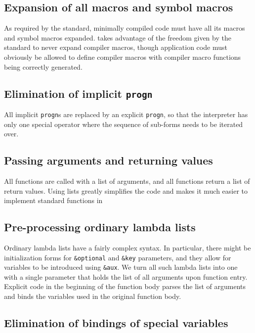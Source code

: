 \subsection{Expansion of all macros and symbol macros}

As required by the \commonlisp{} standard, minimally compiled code
must have all its macros and symbol macros expanded.  \sysname{} takes
advantage of the freedom given by the \commonlisp{} standard to never
expand compiler macros, though application code must obviously be
allowed to define compiler macros with compiler macro functions being
correctly generated.

\subsection{Elimination of implicit \texttt{progn}}

All implicit \texttt{progn}s are replaced by an explicit
\texttt{progn}, so that the interpreter has only one special operator
where the sequence of sub-forms needs to be iterated over.

\subsection{Passing arguments and returning values}

All functions are called with a list of arguments, and all functions
return a list of return values.  Using lists greatly simplifies the
code and makes it much easier to implement standard \commonlisp{}
functions in \clanguage{}

\subsection{Pre-processing ordinary lambda lists}
\label{pre-processing-ordinary-lambda-lists}

Ordinary lambda lists have a fairly complex syntax.  In particular,
there might be initialization forms for \texttt{\&optional} and
\texttt{\&key} parameters, and they allow for variables to be
introduced using \texttt{\&aux}.  We turn all such lambda lists into
one with a single parameter that holds the list of all arguments upon
function entry.  Explicit code in the beginning of the function body
parses the list of arguments and binds the variables used in the
original function body.

\subsection{Elimination of bindings of special variables}

